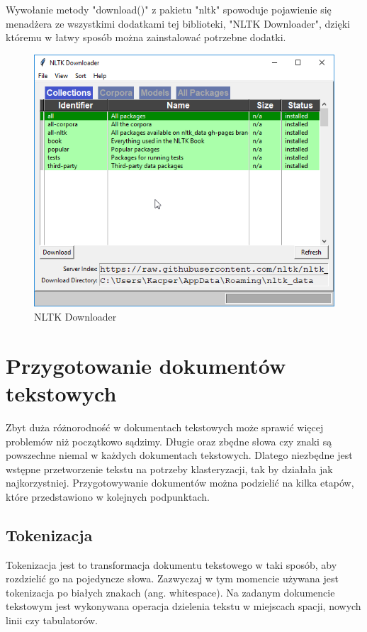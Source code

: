 Wywołanie metody "download()" z pakietu "nltk" spowoduje pojawienie się menadżera ze wszystkimi dodatkami tej biblioteki, "NLTK Downloader", dzięki któremu w łatwy sposób można zainstalować potrzebne dodatki.
\begin{figure}[h!]
    \centering
    \includegraphics[scale=0.7]{Rysunki/Rozdzial2/6.png}
    \caption{NLTK Downloader}
    \label{fig:nltkdownloader}
\end{figure}

\section{Przygotowanie dokumentów tekstowych} \label{prepareDocs}
Zbyt duża różnorodność w dokumentach tekstowych może sprawić więcej problemów niż początkowo sądzimy. Długie oraz zbędne słowa czy znaki są powszechne niemal w każdych dokumentach tekstowych. Dlatego niezbędne jest wstępne przetworzenie tekstu na potrzeby klasteryzacji, tak by działała jak najkorzystniej. Przygotowywanie dokumentów można podzielić na kilka etapów, które przedstawiono w kolejnych podpunktach.

    \subsection{Tokenizacja} \label{sec:tokenizacja}
    Tokenizacja jest to transformacja dokumentu tekstowego w taki sposób, aby rozdzielić go na pojedyncze słowa. Zazwyczaj w tym momencie używana jest tokenizacja po białych znakach (ang. whitespace). Na zadanym dokumencie tekstowym jest wykonywana operacja dzielenia tekstu w miejscach spacji, nowych linii czy tabulatorów.
    
